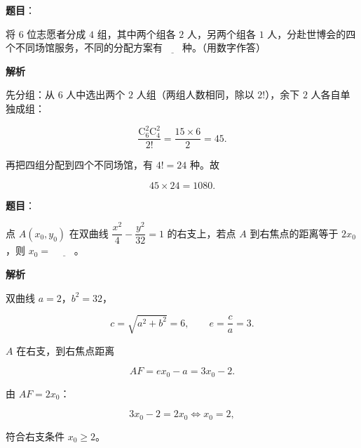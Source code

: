 \begin{answer}

\textbf{题目}：

将 $6$ 位志愿者分成 $4$ 组，其中两个组各 $2$ 人，另两个组各 $1$ 人，分赴世博会的四个不同场馆服务，不同的分配方案有$\underline{\qquad}$种。（用数字作答）

\textbf{解析}

先分组：从 $6$ 人中选出两个 $2$ 人组（两组人数相同，除以 $2!$），余下 $2$ 人各自单独成组：

\nopagebreak[4]
\[\frac{\mathrm C_6^2\mathrm C_4^2}{2!}=\frac{15\times6}{2}=45.\]

再把四组分配到四个不同场馆，有 $4!=24$ 种。故

\nopagebreak[4]
\[45\times24=1080.\]


\end{answer}
\begin{answer}

\textbf{题目}：

点 $A(x_0,y_0)$ 在双曲线 $\dfrac{x^2}{4}-\dfrac{y^2}{32}=1$ 的右支上，若点 $A$ 到右焦点的距离等于 $2x_0$，则 $x_0=$ $\underline{\qquad}$。

\textbf{解析}

双曲线 $a=2$，$b^2=32$，

\nopagebreak[4]
\[c=\sqrt{a^2+b^2}=6,\qquad e=\frac ca=3.\]

$A$ 在右支，到右焦点距离

\nopagebreak[4]
\[AF=ex_0-a=3x_0-2.\]

由 $AF=2x_0$：

\nopagebreak[4]
\[3x_0-2=2x_0\iff x_0=2,\]

符合右支条件 $x_0\geqslant2$。


\end{answer}
